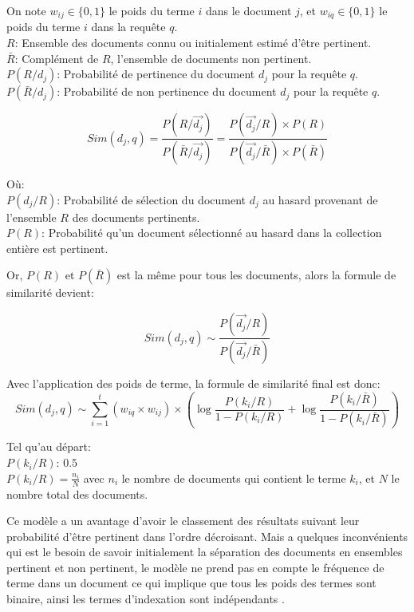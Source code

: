 \begin{definition}
    On note $w_{ij} \in \{0, 1\}$ le poids du terme $i$ dans le document $j$, et $w_{iq} \in \{0, 1\}$ le poids du terme $i$ dans la requête $q$.\\
    $R$: Ensemble des documents connu ou initialement estimé d'être pertinent.\\
    $\bar{R}$: Complément de $R$, l'ensemble de documents non pertinent.\\
    $P(R/d_{j})$: Probabilité de pertinence du document $d_{j}$ pour la requête $q$. \\
    $P(\bar{R}/d_{j})$: Probabilité de non pertinence du document $d_{j}$ pour la requête $q$.

    \[
        Sim(d_{j}, q) = \frac{ P(R/\vec{d_{j}}) }{ P(\bar{R}/\vec{d_{j}}) } = \frac{P(\vec{d_{j}}/R) \times P(R)}{P(\vec{d_{j}}/\bar{R}) \times P(\bar{R})}
    \]

    Où:\\
    $ P(d_{j}/R) $: Probabilité de sélection du document $ d_{j} $ au hasard provenant de l'ensemble $ R $ des documents pertinents.\\
    $ P(R) $: Probabilité qu'un document sélectionné au hasard dans la collection entière est pertinent.

    Or, $ P(R) $ et $ P(\bar{R}) $ est la même pour tous les documents, alors la formule de similarité devient:
    
    \[
        Sim(d_{j}, q) \sim \frac{P(\vec{d_{j}}/R)}{P(\vec{d_{j}}/\bar{R})}
    \]

    Avec l'application des poids de terme, la formule de similarité final est donc:
    \[
        Sim(d_{j}, q) \sim \sum_{i = 1}^{t} (w_{iq} \times w_{ij}) \times \left(
            \log{\frac{P(k_{i}/R)}{1 - P(k_{i}/R)}} + \log{\frac{P(k_{i}/\bar{R})}{1 - P(k_{i}/\bar{R})}}
        \right)
    \]

    Tel qu'au départ:\\
    $ P(k_{i}/R) $: $ 0.5 $ \\
    $ P(k_{i}/R) = \frac{n_{i}}{N} $ avec $ n_{i} $ le nombre de documents qui contient le terme $ k_{i} $, et $ N $ le nombre total des documents.
\end{definition}

Ce modèle a un avantage d'avoir le classement des résultats suivant leur probabilité d'être pertinent dans l'ordre décroisant. Mais a quelques inconvénients qui est le besoin de savoir initialement la séparation des documents en ensembles pertinent et non pertinent, le modèle ne prend pas en compte le fréquence de terme dans un document ce qui implique que tous les poids des termes sont binaire, ainsi les termes d'indexation sont indépendants \citep{modern-ir}.

